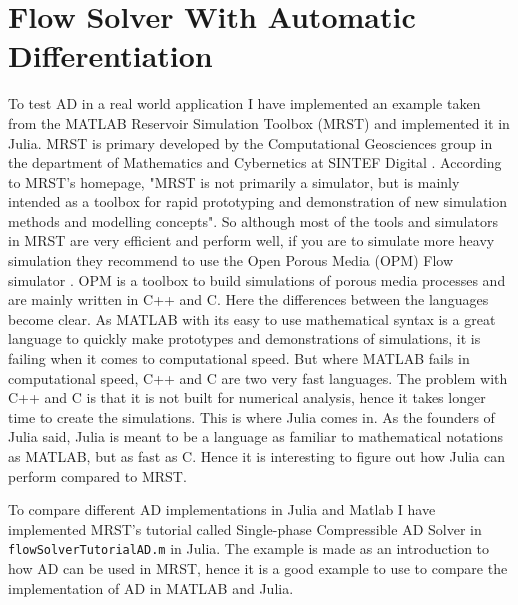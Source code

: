 \section{Flow Solver With Automatic Differentiation}
To test AD in a real world application I have implemented an example taken from the MATLAB Reservoir Simulation Toolbox (MRST) and implemented it in Julia. MRST is primary developed by the Computational Geosciences group in the department of Mathematics and Cybernetics at SINTEF Digital \emph{\cite{mrstHomepage}}. According to MRST's homepage, "MRST is not primarily a simulator, but is mainly intended as a toolbox for rapid prototyping and demonstration of new simulation methods and modelling concepts". So although most of the tools and simulators in MRST are very efficient and perform well, if you are to simulate more heavy simulation they recommend to use the Open Porous Media (OPM) Flow simulator \emph{\citep{OPM}}. OPM is a toolbox to build simulations of porous media processes and are mainly written in C++ and C. Here the differences between the languages become clear. As MATLAB with its easy to use mathematical syntax is a great language to quickly make prototypes and demonstrations of simulations, it is failing when it comes to computational speed. But where MATLAB fails in computational speed, C++ and C are two very fast languages. The problem with C++ and C is that it is not built for numerical analysis, hence it takes longer time to create the simulations. This is where Julia comes in. As the founders of Julia said, Julia is meant to be a language as familiar to mathematical notations as MATLAB, but as fast as C. Hence it is interesting to figure out how Julia can perform compared to MRST.

To compare different AD implementations in Julia and Matlab I have implemented MRST's tutorial called Single-phase Compressible AD Solver in \texttt{flowSolverTutorialAD.m} \emph{\citep{flowSolverADExample}} in Julia. The example is made as an introduction to how AD can be used in MRST, hence it is a good example to use to compare the implementation of AD in MATLAB and Julia. 

